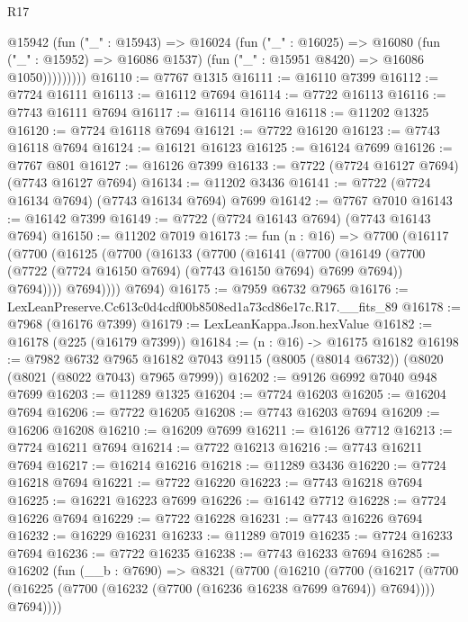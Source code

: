 \begin{lexlean}{R17}
\begin{coremodule}
              @15942
                (fun ("_" : @15943) =>
                @16024
                  (fun ("_" : @16025) =>
                  @16080
                    (fun ("_" : @15952) => @16086 @1537)
                    (fun ("_" : @15951 @8420) => @16086 @1050)))))))))
@16110 := @7767 @1315
@16111 := @16110 @7399
@16112 := @7724 @16111
@16113 := @16112 @7694
@16114 := @7722 @16113
@16116 := @7743 @16111 @7694
@16117 := @16114 @16116
@16118 := @11202 @1325
@16120 := @7724 @16118 @7694
@16121 := @7722 @16120
@16123 := @7743 @16118 @7694
@16124 := @16121 @16123
@16125 := @16124 @7699
@16126 := @7767 @801
@16127 := @16126 @7399
@16133 := @7722 (@7724 @16127 @7694) (@7743 @16127 @7694)
@16134 := @11202 @3436
@16141 := @7722 (@7724 @16134 @7694) (@7743 @16134 @7694) @7699
@16142 := @7767 @7010
@16143 := @16142 @7399
@16149 := @7722 (@7724 @16143 @7694) (@7743 @16143 @7694)
@16150 := @11202 @7019
@16173 := fun (n : @16) =>
  @7700
    (@16117
      (@7700
        (@16125
          (@7700
            (@16133
              (@7700
                (@16141
                  (@7700
                    (@16149
                      (@7700 (@7722 (@7724 @16150 @7694) (@7743 @16150 @7694) @7699 @7694))
                      @7694))))
              @7694))))
      @7694)
@16175 := @7959 @6732 @7965
@16176 := LexLeanPreserve.Cc613c0d4cdf00b8508ed1a73cd86e17c.R17.__fits_89
@16178 := @7968 (@16176 @7399)
@16179 := LexLeanKappa.Json.hexValue
@16182 := @16178 (@225 (@16179 @7399))
@16184 := (n : @16) -> @16175 @16182
@16198 := @7982
    @6732
    @7965
    @16182
    @7043
    @9115
    (@8005 (@8014 @6732))
    (@8020 (@8021 (@8022 @7043) @7965 @7999))
@16202 := @9126 @6992 @7040 @948 @7699
@16203 := @11289 @1325
@16204 := @7724 @16203
@16205 := @16204 @7694
@16206 := @7722 @16205
@16208 := @7743 @16203 @7694
@16209 := @16206 @16208
@16210 := @16209 @7699
@16211 := @16126 @7712
@16213 := @7724 @16211 @7694
@16214 := @7722 @16213
@16216 := @7743 @16211 @7694
@16217 := @16214 @16216
@16218 := @11289 @3436
@16220 := @7724 @16218 @7694
@16221 := @7722 @16220
@16223 := @7743 @16218 @7694
@16225 := @16221 @16223 @7699
@16226 := @16142 @7712
@16228 := @7724 @16226 @7694
@16229 := @7722 @16228
@16231 := @7743 @16226 @7694
@16232 := @16229 @16231
@16233 := @11289 @7019
@16235 := @7724 @16233 @7694
@16236 := @7722 @16235
@16238 := @7743 @16233 @7694
@16285 := @16202
    (fun (__b : @7690) =>
    @8321
      (@7700
        (@16210
          (@7700
            (@16217
              (@7700 (@16225 (@7700 (@16232 (@7700 (@16236 @16238 @7699 @7694)) @7694))))
              @7694))))

\end{coremodule}
\end{lexlean}
